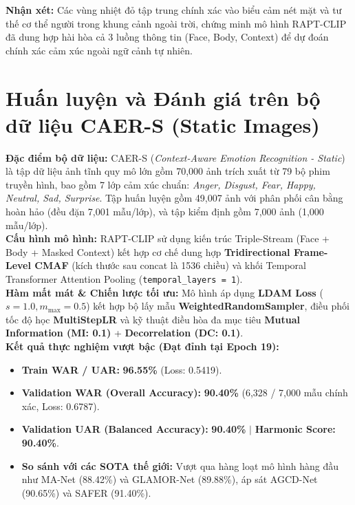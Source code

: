 \documentclass[10pt,a4paper]{article}
\begin{document}
\noindent\textbf{Nhận xét:} Các vùng nhiệt đỏ tập trung chính xác vào biểu cảm nét mặt và tư thế cơ thể người trong khung cảnh ngoài trời, chứng minh mô hình RAPT-CLIP đã dung hợp hài hòa cả 3 luồng thông tin (Face, Body, Context) để dự đoán chính xác cảm xúc ngoài ngữ cảnh tự nhiên.

\section{Huấn luyện và Đánh giá trên bộ dữ liệu CAER-S (Static Images)}

\noindent\textbf{Đặc điểm bộ dữ liệu:} CAER-S (\textit{Context-Aware Emotion Recognition - Static}) là tập dữ liệu ảnh tĩnh quy mô lớn gồm 70,000 ảnh trích xuất từ 79 bộ phim truyền hình, bao gồm 7 lớp cảm xúc chuẩn: \textit{Anger, Disgust, Fear, Happy, Neutral, Sad, Surprise}. Tập huấn luyện gồm 49,007 ảnh với phân phối cân bằng hoàn hảo (đều đặn 7,001 mẫu/lớp), và tập kiểm định gồm 7,000 ảnh (1,000 mẫu/lớp).\\
\textbf{Cấu hình mô hình:} RAPT-CLIP sử dụng kiến trúc Triple-Stream (Face + Body + Masked Context) kết hợp cơ chế dung hợp \textbf{Tridirectional Frame-Level CMAF} (kích thước sau concat là 1536 chiều) và khối Temporal Transformer Attention Pooling (\texttt{temporal\_layers = 1}).\\
\textbf{Hàm mất mát \& Chiến lược tối ưu:} Mô hình áp dụng \textbf{LDAM Loss} ($s = 1.0, m_{\max} = 0.5$) kết hợp bộ lấy mẫu \textbf{WeightedRandomSampler}, điều phối tốc độ học \textbf{MultiStepLR} và kỹ thuật điều hòa đa mục tiêu \textbf{Mutual Information (MI: 0.1)} + \textbf{Decorrelation (DC: 0.1)}.\\
\textbf{Kết quả thực nghiệm vượt bậc (Đạt đỉnh tại Epoch 19):}
\begin{itemize}[leftmargin=18pt, itemsep=1pt]
    \item \textbf{Train WAR / UAR:} \textbf{96.55\%} (Loss: 0.5419).
    \item \textbf{Validation WAR (Overall Accuracy):} \textbf{90.40\%} (6,328 / 7,000 mẫu chính xác, Loss: 0.6787).
    \item \textbf{Validation UAR (Balanced Accuracy):} \textbf{90.40\%} $|$ \textbf{Harmonic Score:} \textbf{90.40\%}.
    \item \textbf{So sánh với các SOTA thế giới:} Vượt qua hàng loạt mô hình hàng đầu như MA-Net (88.42\%) và GLAMOR-Net (89.88\%), áp sát AGCD-Net (90.65\%) và SAFER (91.40\%).
\end{itemize}
\end{document}
